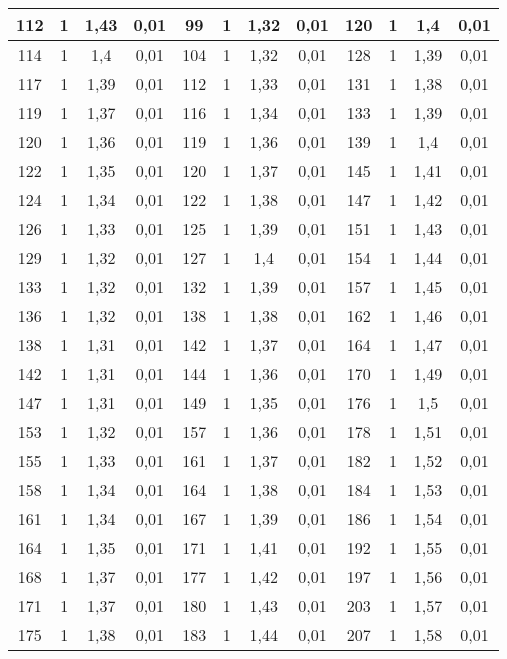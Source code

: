 \begin{tabular}{|*{12}{c|}}
 112 & 1 & 1,43 & 0,01 & 99 & 1 & 1,32 & 0,01 & 120 & 1 & 1,4 & 0,01 \\ \hline 
 114 & 1 & 1,4 & 0,01 & 104 & 1 & 1,32 & 0,01 & 128 & 1 & 1,39 & 0,01 \\ \hline 
 117 & 1 & 1,39 & 0,01 & 112 & 1 & 1,33 & 0,01 & 131 & 1 & 1,38 & 0,01 \\ \hline 
 119 & 1 & 1,37 & 0,01 & 116 & 1 & 1,34 & 0,01 & 133 & 1 & 1,39 & 0,01 \\ \hline 
 120 & 1 & 1,36 & 0,01 & 119 & 1 & 1,36 & 0,01 & 139 & 1 & 1,4 & 0,01 \\ \hline 
 122 & 1 & 1,35 & 0,01 & 120 & 1 & 1,37 & 0,01 & 145 & 1 & 1,41 & 0,01 \\ \hline 
 124 & 1 & 1,34 & 0,01 & 122 & 1 & 1,38 & 0,01 & 147 & 1 & 1,42 & 0,01 \\ \hline 
 126 & 1 & 1,33 & 0,01 & 125 & 1 & 1,39 & 0,01 & 151 & 1 & 1,43 & 0,01 \\ \hline 
 129 & 1 & 1,32 & 0,01 & 127 & 1 & 1,4 & 0,01 & 154 & 1 & 1,44 & 0,01 \\ \hline 
 133 & 1 & 1,32 & 0,01 & 132 & 1 & 1,39 & 0,01 & 157 & 1 & 1,45 & 0,01 \\ \hline 
 136 & 1 & 1,32 & 0,01 & 138 & 1 & 1,38 & 0,01 & 162 & 1 & 1,46 & 0,01 \\ \hline 
 138 & 1 & 1,31 & 0,01 & 142 & 1 & 1,37 & 0,01 & 164 & 1 & 1,47 & 0,01 \\ \hline 
 142 & 1 & 1,31 & 0,01 & 144 & 1 & 1,36 & 0,01 & 170 & 1 & 1,49 & 0,01 \\ \hline 
 147 & 1 & 1,31 & 0,01 & 149 & 1 & 1,35 & 0,01 & 176 & 1 & 1,5 & 0,01 \\ \hline 
 153 & 1 & 1,32 & 0,01 & 157 & 1 & 1,36 & 0,01 & 178 & 1 & 1,51 & 0,01 \\ \hline 
 155 & 1 & 1,33 & 0,01 & 161 & 1 & 1,37 & 0,01 & 182 & 1 & 1,52 & 0,01 \\ \hline 
 158 & 1 & 1,34 & 0,01 & 164 & 1 & 1,38 & 0,01 & 184 & 1 & 1,53 & 0,01 \\ \hline 
 161 & 1 & 1,34 & 0,01 & 167 & 1 & 1,39 & 0,01 & 186 & 1 & 1,54 & 0,01 \\ \hline 
 164 & 1 & 1,35 & 0,01 & 171 & 1 & 1,41 & 0,01 & 192 & 1 & 1,55 & 0,01 \\ \hline 
 168 & 1 & 1,37 & 0,01 & 177 & 1 & 1,42 & 0,01 & 197 & 1 & 1,56 & 0,01 \\ \hline 
 171 & 1 & 1,37 & 0,01 & 180 & 1 & 1,43 & 0,01 & 203 & 1 & 1,57 & 0,01 \\ \hline 
 175 & 1 & 1,38 & 0,01 & 183 & 1 & 1,44 & 0,01 & 207 & 1 & 1,58 & 0,01 \\ \hline 

\end{tabular}

